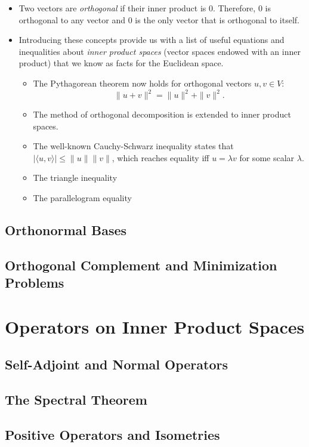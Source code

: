 \documentclass{article}
\begin{document}
\begin{itemize}
    \item Two vectors are \textit{orthogonal} if their inner product is 0. Therefore, 0 is orthogonal to any vector and 0 is the only vector that is orthogonal to itself.
    \item Introducing these concepts provide us with a list of useful equations and inequalities about \textit{inner product spaces} (vector spaces endowed with an inner product) that we know as facts for the Euclidean space.
    \begin{itemize}
        \item The Pythagorean theorem now holds for orthogonal vectors $u,v \in V$: $$\|u+v\|^2 = \|u\|^2 + \|v\|^2.$$
        \item The method of orthogonal decomposition is extended to inner product spaces. 
        \item The well-known Cauchy-Schwarz inequality states that $|\langle u,v \rangle| \leq \|u\|\|v\|$, which reaches equality iff $u = \lambda v$ for some scalar $\lambda$.
        \item The triangle inequality
        \item The parallelogram equality
    \end{itemize}
\end{itemize}
\subsection{Orthonormal Bases}

\subsection{Orthogonal Complement and Minimization Problems}


\section{Operators on Inner Product Spaces}
\subsection{Self-Adjoint and Normal Operators}

\subsection{The Spectral Theorem}

\subsection{Positive Operators and Isometries}
\end{document}

